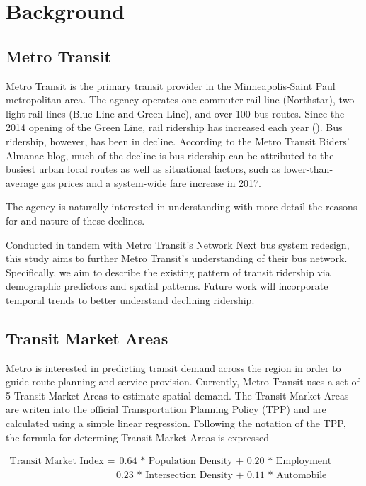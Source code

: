 \documentclass[
]{article}
\begin{document}
\hypertarget{background}{%
\section{Background}\label{background}}

\hypertarget{metro-transit}{%
\subsection{Metro Transit}\label{metro-transit}}

Metro Transit is the primary transit provider in the Minneapolis-Saint
Paul metropolitan area. The agency operates one commuter rail line
(Northstar), two light rail lines (Blue Line and Green Line), and over
100 bus routes. Since the 2014 opening of the Green Line, rail ridership
has increased each year (). Bus ridership, however, has been in decline.
According to the Metro Transit Riders' Almanac blog, much of the decline
is bus ridership can be attributed to the busiest urban local routes as
well as situational factors, such as lower-than-average gas prices and a
system-wide fare increase in 2017.

The agency is naturally interested in understanding with more detail the
reasons for and nature of these declines.

Conducted in tandem with Metro Transit's Network Next bus system
redesign, this study aims to further Metro Transit's understanding of
their bus network. Specifically, we aim to describe the existing pattern
of transit ridership via demographic predictors and spatial patterns.
Future work will incorporate temporal trends to better understand
declining ridership.

\hypertarget{transit-market-areas}{%
\subsection{Transit Market Areas}\label{transit-market-areas}}

Metro is interested in predicting transit demand across the region in
order to guide route planning and service provision. Currently, Metro
Transit uses a set of 5 Transit Market Areas to estimate spatial demand.
The Transit Market Areas are writen into the official Transportation
Planning Policy (TPP) and are calculated using a simple linear
regression. Following the notation of the TPP, the formula for determing
Transit Market Areas is expressed

\[
\begin{aligned}
\text{Transit Market Index } = & \text{ 0.64 * Population Density + 0.20 * Employment Density +} \\
& \text{0.23 * Intersection Density + 0.11 * Automobile Availability}
\end{aligned}
\]
\end{document}

